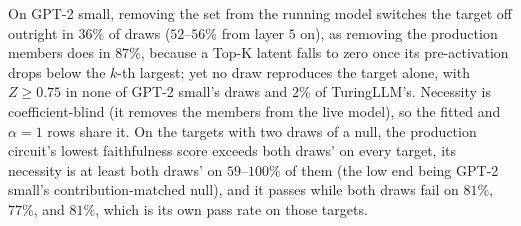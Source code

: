 On GPT-2 small, removing the set from the running model switches the target off outright in $36\%$ of draws ($52$--$56\%$ from layer $5$ on), as removing the production members does in $87\%$, because a Top-K latent falls to zero once its pre-activation drops below the $k$-th largest; yet no draw reproduces the target alone, with $Z \ge 0.75$ in none of GPT-2 small's draws and $2\%$ of TuringLLM's.
Necessity is coefficient-blind (it removes the members from the live model), so the fitted and $\alpha = 1$ rows share it.
On the targets with two draws of a null, the production circuit's lowest faithfulness score exceeds both draws' on every target, its necessity is at least both draws' on $59$--$100\%$ of them (the low end being GPT-2 small's contribution-matched null), and it passes while both draws fail on $81\%$, $77\%$, and $81\%$, which is its own pass rate on those targets.
